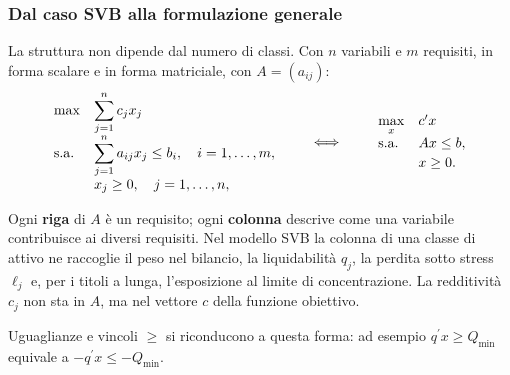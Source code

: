 \begin{frame}%
%

\frametitle{Dal caso SVB alla formulazione generale}%
%

%


La struttura non dipende dal numero di classi. Con $n$ variabili e $m$
requisiti, in forma scalare e in forma matriciale, con $A=(a_{ij})$:
\[%
\begin{array}
[c]{ll}%
\max & \displaystyle\sum_{j=1}^{n}c_{j}x_{j}\\[6pt]%
\text{s.a.} & \displaystyle\sum_{j=1}^{n}a_{ij}x_{j}\leq b_{i},\quad
i=1,\ldots,m,\\[4pt]
& x_{j}\geq0,\quad j=1,\ldots,n,
\end{array}
\qquad\Longleftrightarrow\qquad%
\begin{array}
[c]{ll}%
\max\limits_{x} & c^{\prime}x\\[4pt]%
\text{s.a.} & Ax\leq b,\\[2pt]
& x\geq0.
\end{array}
\]


\begin{stepitemize}
\item Ogni \textbf{riga} di $A$ \`e un requisito; ogni \textbf{colonna}
descrive come una variabile contribuisce ai diversi requisiti. Nel modello SVB
la colonna di una classe di attivo ne raccoglie il peso nel bilancio, la
liquidabilit\`a $q_{j}$, la perdita sotto stress $\ell_{j}$ e, per i titoli a
lunga, l'esposizione al limite di concentrazione. La redditivit\`a $c_{j}$ non
sta in $A$, ma nel vettore $c$ della funzione obiettivo.

\item Uguaglianze e vincoli $\geq$ si riconducono a questa forma: ad esempio
$q^{\prime}x\geq Q_{\min}$ equivale a $-q^{\prime}x\leq-Q_{\min}$.
\end{stepitemize}

%

\transboxout
\end{frame}%


